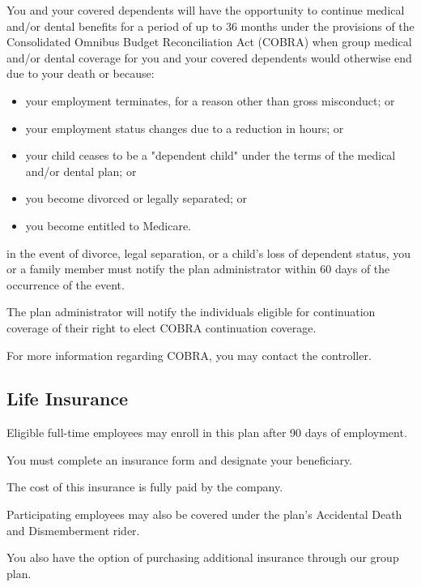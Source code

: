 You and your covered dependents will have the opportunity to continue medical and/or dental benefits for a period of up to 36 months under the provisions of the Consolidated Omnibus Budget Reconciliation Act (COBRA) when group medical and/or dental coverage for you and your covered dependents would otherwise end due to your death or because:

\begin{itemize} 	\item your employment terminates, for a reason other 	than gross misconduct; or
	
	\item your employment status changes due to a 	reduction in hours; or
	
	\item your child ceases to be a "dependent child" 	under the terms of the medical and/or dental 	plan; or
	
	\item you become divorced or legally separated; or
	
	\item you become entitled to Medicare. \end{itemize}

in the event of divorce, legal separation, or a child's loss of dependent status, you or a family member must notify the plan administrator within 60 days of the occurrence of the event.

The plan administrator will notify the individuals eligible for continuation coverage of their right to elect COBRA continuation coverage.

For more information regarding COBRA, you may contact the controller.

\subsection{Life Insurance}

Eligible full-time employees may enroll in this plan after 90 days of employment.

You must complete an insurance form and designate your beneficiary.

The cost of this insurance is fully paid by the company.

Participating employees may also be covered under the plan's Accidental Death and Dismemberment rider.

You also have the option of purchasing additional insurance through our group plan.

